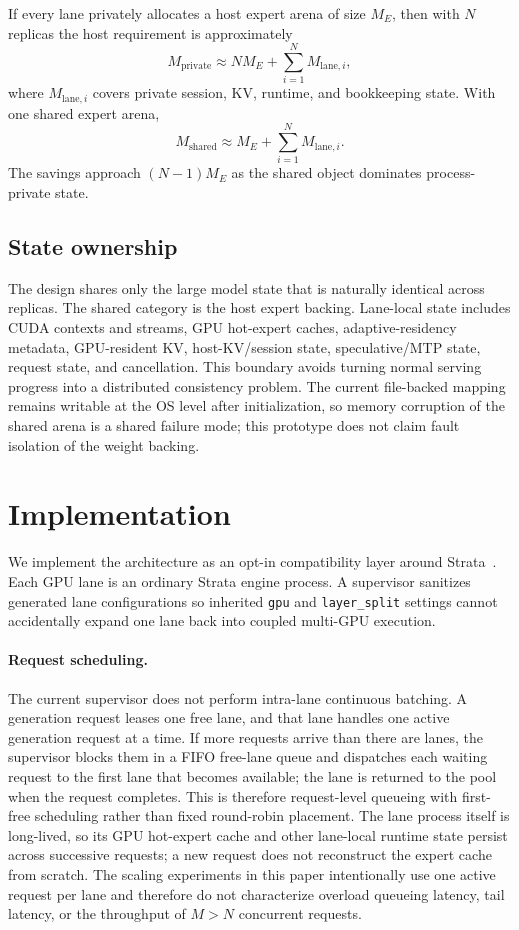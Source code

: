 If every lane privately allocates a host expert arena of size $M_E$, then with $N$ replicas the host requirement is approximately
\begin{equation}
M_{\mathrm{private}} \approx N M_E + \sum_{i=1}^{N} M_{\mathrm{lane},i},
\label{eq:private}
\end{equation}
where $M_{\mathrm{lane},i}$ covers private session, KV, runtime, and bookkeeping state. With one shared expert arena,
\begin{equation}
M_{\mathrm{shared}} \approx M_E + \sum_{i=1}^{N} M_{\mathrm{lane},i}.
\label{eq:shared}
\end{equation}
The savings approach $(N-1)M_E$ as the shared object dominates process-private state.

\subsection{State ownership}
The design shares only the large model state that is naturally identical across replicas. The shared category is the host expert backing. Lane-local state includes CUDA contexts and streams, GPU hot-expert caches, adaptive-residency metadata, GPU-resident KV, host-KV/session state, speculative/MTP state, request state, and cancellation. This boundary avoids turning normal serving progress into a distributed consistency problem. The current file-backed mapping remains writable at the OS level after initialization, so memory corruption of the shared arena is a shared failure mode; this prototype does not claim fault isolation of the weight backing.

\section{Implementation}
We implement the architecture as an opt-in compatibility layer around Strata~\cite{strata}. Each GPU lane is an ordinary Strata engine process. A supervisor sanitizes generated lane configurations so inherited \texttt{gpu} and \texttt{layer\_split} settings cannot accidentally expand one lane back into coupled multi-GPU execution.

\paragraph{Request scheduling.}
The current supervisor does not perform intra-lane continuous batching. A generation request leases one free lane, and that lane handles one active generation request at a time. If more requests arrive than there are lanes, the supervisor blocks them in a FIFO free-lane queue and dispatches each waiting request to the first lane that becomes available; the lane is returned to the pool when the request completes. This is therefore request-level queueing with first-free scheduling rather than fixed round-robin placement. The lane process itself is long-lived, so its GPU hot-expert cache and other lane-local runtime state persist across successive requests; a new request does not reconstruct the expert cache from scratch. The scaling experiments in this paper intentionally use one active request per lane and therefore do not characterize overload queueing latency, tail latency, or the throughput of $M>N$ concurrent requests.

